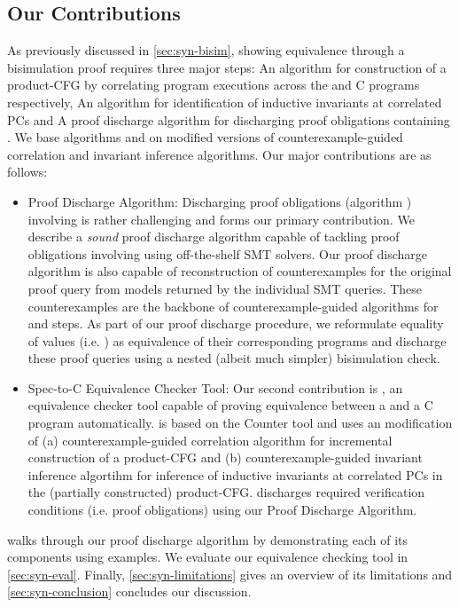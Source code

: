 \subsection{Our Contributions}
\label{sec:syn-contribs}
As previously discussed in \cref{sec:syn-bisim}, showing equivalence through a bisimulation proof
requires three major steps:
 An algorithm for construction of a product-CFG by correlating
program executions across the \SpecL{} and C programs respectively,
 An algorithm for identification of inductive invariants at correlated PCs and
 A proof discharge algorithm for discharging proof obligations containing \recursiveRelations{}.
We base algorithms  and  on modified versions of counterexample-guided correlation
and invariant inference algorithms\cite{oopsla20}. Our major contributions are as follows:

\begin{itemize}
\setlength{\itemsep}{0px}
\item Proof Discharge Algorithm: Discharging proof obligations (algorithm )
involving \recursiveRelations{} is rather challenging and forms our primary contribution.
We describe a {\em sound} proof discharge algorithm capable of tackling proof obligations involving
\recursiveRelations{} using off-the-shelf SMT solvers. Our proof discharge algorithm is also capable of
reconstruction of counterexamples for the original proof query from models returned by the individual SMT queries.
These counterexamples are the backbone of counterexample-guided algorithms for
 and  steps. As part of our proof discharge procedure,
we reformulate equality of values (i.e. \recursiveRelations{}) as equivalence of their corresponding programs
and discharge these proof queries using a nested (albeit much simpler) bisimulation check.

\item Spec-to-C Equivalence Checker Tool: Our second contribution is \toolName{}, an equivalence checker tool
capable of proving equivalence between a \SpecL{} and a C program automatically. \toolName{} is based on
the Counter tool\cite{oopsla20} and uses an modification of (a) counterexample-guided correlation algorithm for
incremental construction of a product-CFG and (b) counterexample-guided invariant inference algortihm
for inference of inductive invariants at correlated PCs in the (partially constructed) product-CFG.
\toolName{} discharges required verification conditions (i.e. proof obligations) using our Proof Discharge Algorithm.
\end{itemize}
\vspace{-5px}
 walks through our proof discharge algorithm by demonstrating each of its
components using examples. We evaluate our equivalence checking tool \toolName{} in \cref{sec:syn-eval}.
Finally, \cref{sec:syn-limitations} gives an overview of its limitations and \cref{sec:syn-conclusion} concludes our discussion.